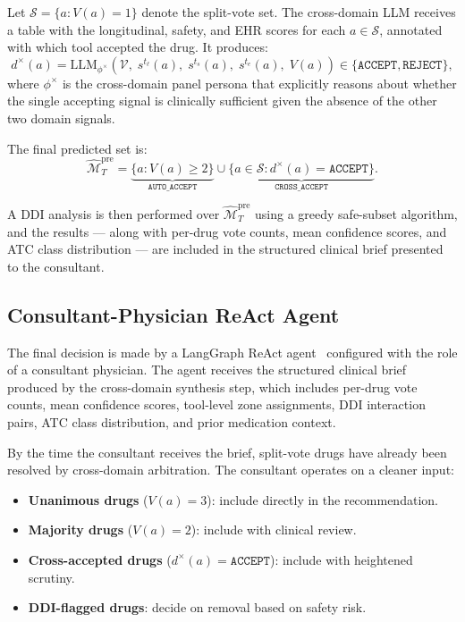 \documentclass[sigconf,anonymous]{acmart}
\begin{document}
Let $\mathcal{S} = \{a : V(a) = 1\}$ denote the split-vote set. The cross-domain LLM receives a table with the longitudinal, safety, and EHR scores for each $a \in \mathcal{S}$, annotated with which tool accepted the drug. It produces:
\begin{equation}
d^{\times}(a) = \text{LLM}_{\phi^\times}\!\left(\mathcal{V},\; s^{t_\ell}(a),\; s^{t_s}(a),\; s^{t_e}(a),\; V(a)\right) \in \{\texttt{ACCEPT}, \texttt{REJECT}\},
\end{equation}
where $\phi^\times$ is the cross-domain panel persona that explicitly reasons about whether the single accepting signal is clinically sufficient given the absence of the other two domain signals.

The final predicted set is:
\begin{equation}
\hat{\mathcal{M}}_T^{\text{pre}} = \underbrace{\{a : V(a) \geq 2\}}_{\texttt{AUTO\_ACCEPT}} \cup \underbrace{\{a \in \mathcal{S} : d^{\times}(a) = \texttt{ACCEPT}\}}_{\texttt{CROSS\_ACCEPT}}.
\end{equation}

A DDI analysis is then performed over $\hat{\mathcal{M}}_T^{\text{pre}}$ using a greedy safe-subset algorithm, and the results — along with per-drug vote counts, mean confidence scores, and ATC class distribution — are included in the structured clinical brief presented to the consultant.

\subsection{Consultant-Physician ReAct Agent}

The final decision is made by a LangGraph ReAct agent~\cite{langgraph} configured with the role of a consultant physician. The agent receives the structured clinical brief produced by the cross-domain synthesis step, which includes per-drug vote counts, mean confidence scores, tool-level zone assignments, DDI interaction pairs, ATC class distribution, and prior medication context.

By the time the consultant receives the brief, split-vote drugs have already been resolved by cross-domain arbitration. The consultant operates on a cleaner input:
\begin{itemize}
  \item \textbf{Unanimous drugs} ($V(a) = 3$): include directly in the recommendation.
  \item \textbf{Majority drugs} ($V(a) = 2$): include with clinical review.
  \item \textbf{Cross-accepted drugs} ($d^{\times}(a) = \texttt{ACCEPT}$): include with heightened scrutiny.
  \item \textbf{DDI-flagged drugs}: decide on removal based on safety risk.
\end{itemize}
\end{document}
